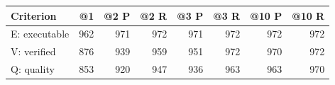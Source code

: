 \begin{tabular}{lrrrrrrr}
\toprule
Criterion & @1 & @2 P & @2 R & @3 P & @3 R & @10 P & @10 R \\
\midrule
E: executable & 962 & 971 & 972 & 971 & 972 & 972 & 972 \\
V: verified & 876 & 939 & 959 & 951 & 972 & 970 & 972 \\
Q: quality & 853 & 920 & 947 & 936 & 963 & 963 & 970 \\
\bottomrule
\end{tabular}
